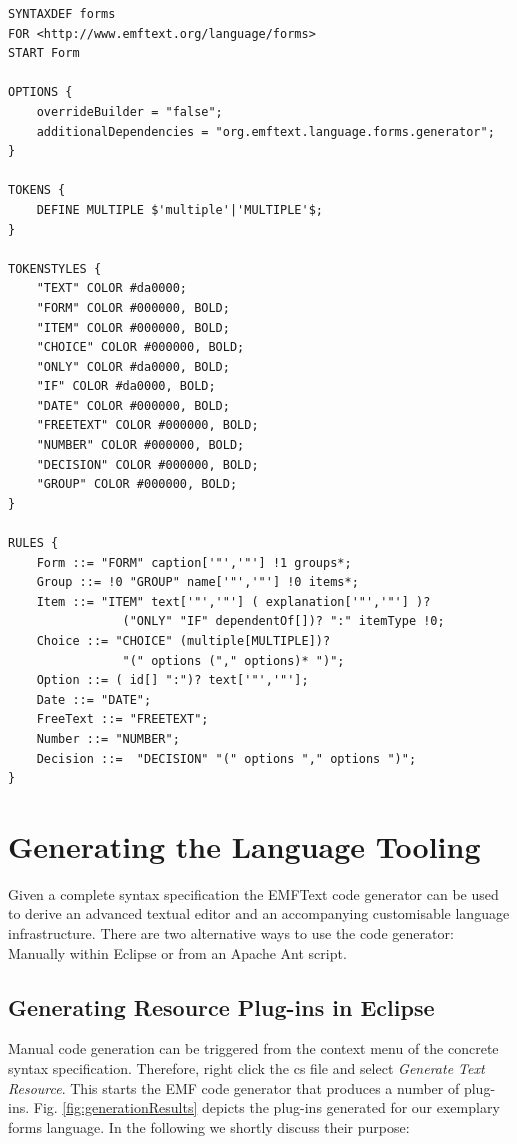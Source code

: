  \lstset{language=cs}
	\begin{lstlisting}[label=lst:formsCs, caption=Concrete syntax specification for
	the exemplary forms language written in the cs-language] 
SYNTAXDEF forms
FOR <http://www.emftext.org/language/forms>
START Form

OPTIONS {
	overrideBuilder = "false";
	additionalDependencies = "org.emftext.language.forms.generator";
}

TOKENS {
	DEFINE MULTIPLE $'multiple'|'MULTIPLE'$;
}

TOKENSTYLES {
	"TEXT" COLOR #da0000;
	"FORM" COLOR #000000, BOLD;
	"ITEM" COLOR #000000, BOLD;
	"CHOICE" COLOR #000000, BOLD;
	"ONLY" COLOR #da0000, BOLD;
	"IF" COLOR #da0000, BOLD;
	"DATE" COLOR #000000, BOLD;
	"FREETEXT" COLOR #000000, BOLD;
	"NUMBER" COLOR #000000, BOLD;
	"DECISION" COLOR #000000, BOLD;
	"GROUP" COLOR #000000, BOLD;
}
  
RULES {
	Form ::= "FORM" caption['"','"'] !1 groups*;
	Group ::= !0 "GROUP" name['"','"'] !0 items*;
	Item ::= "ITEM" text['"','"'] ( explanation['"','"'] )? 
				("ONLY" "IF" dependentOf[])? ":" itemType !0;
	Choice ::= "CHOICE" (multiple[MULTIPLE])? 
				"(" options ("," options)* ")";
	Option ::= ( id[] ":")? text['"','"'];
	Date ::= "DATE";
	FreeText ::= "FREETEXT";
	Number ::= "NUMBER";
	Decision ::=  "DECISION" "(" options "," options ")"; 
}

	\end{lstlisting} 
 


\section{Generating the Language Tooling}
\label{sec:process_generating}
	Given a complete syntax specification the EMFText code generator can be used to
	derive an advanced textual editor and an accompanying customisable
	language infrastructure. There are two alternative ways to use the
	code generator: Manually within Eclipse or from an Apache Ant script.


	\subsection{Generating Resource Plug-ins in Eclipse}
	Manual code generation can be triggered from the context menu of the concrete
	syntax specification. Therefore, right click the cs file and select
	\emph{Generate Text Resource}. This starts the EMF code generator that produces
	a number of plug-ins. Fig. \ref{fig:generationResults} depicts the plug-ins
	generated for our exemplary forms language. In the following we shortly discuss
	their purpose:
	
